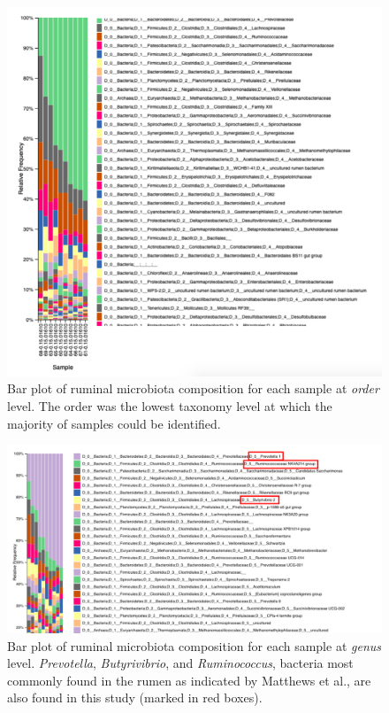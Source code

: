 \documentclass{singlecol-new}
\theoremstyle{TH}{
\newtheorem{lemma}{Lemma}
\newtheorem{theorem}[lemma]{Theorem}
\newtheorem{corrolary}[lemma]{Corrolary}
\newtheorem{conjecture}[lemma]{Conjecture}
\newtheorem{proposition}[lemma]{Proposition}
\newtheorem{claim}[lemma]{Claim}
\newtheorem{stheorem}[lemma]{Wrong Theorem}
\newtheorem{algorithm}{Algorithm}
}
\theoremstyle{THrm}{
\newtheorem{definition}{Definition}[section]
\newtheorem{question}{Question}[section]
\newtheorem{remark}{Remark}
\newtheorem{scheme}{Scheme}
}
\theoremstyle{THhit}{
\newtheorem{case}{Case}[section]
}
\begin{document}
\begin{figure}[htbp]
\centerline{\includegraphics[scale=0.3]{figures/order-bp-w-legend.png}}
\caption{Bar plot of ruminal microbiota composition for each sample at \textit{order} level. The order was the lowest taxonomy level at which the majority of samples could be identified.}
\label{fig. 5}
\end{figure}

\begin{figure}[htbp]
\centerline{\includegraphics[scale=0.2]{figures/common-bacteria-rumen.png}}
\caption{Bar plot of ruminal microbiota composition for each sample at \textit{genus} level. \textit{Prevotella}, \textit{Butyrivibrio}, and \textit{Ruminococcus}, bacteria most commonly found in the rumen as indicated by Matthews et al., are also found in this study (marked in red boxes).}
\label{fig. 6}
\end{figure}
\end{document}
